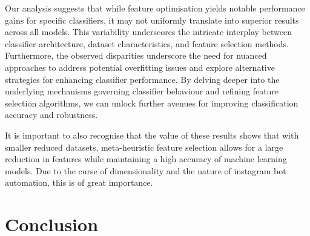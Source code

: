 \documentclass[conference]{IEEEtran}
\begin{document}
Our analysis suggests that while feature optimisation yields notable performance gains for specific classifiers, it may not uniformly translate into superior results across all models. This variability underscores the intricate interplay between classifier architecture, dataset characteristics, and feature selection methods. Furthermore, the observed disparities underscore the need for nuanced approaches to address potential overfitting issues and explore alternative strategies for enhancing classifier performance. By delving deeper into the underlying mechanisms governing classifier behaviour and refining feature selection algorithms, we can unlock further avenues for improving classification accuracy and robustness.

It is important to also recognise that the value of these results shows that with smaller reduced datasets, meta-heuristic feature selection allows for a large reduction in features while maintaining a high accuracy of machine learning models. Due to the curse of dimensionality and the nature of instagram bot automation, this is of great importance.

\section{Conclusion}

%
%

\end{document}
